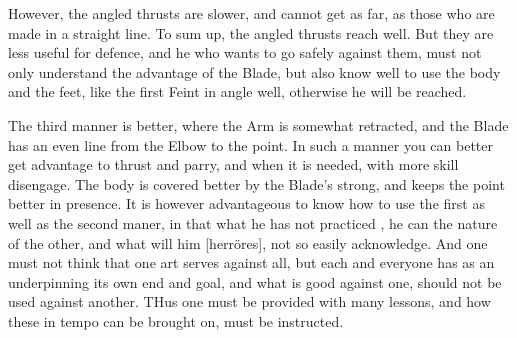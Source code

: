 \newpage


\newpage
{}
However, the angled thrusts are slower, and cannot get as far, as
those who are made in a straight line. To sum up, the angled thrusts
reach well. But they are less useful for defence, and he who wants to
go safely against them, must not only understand the advantage of the
Blade, but also know well to use the body and the feet, like the first
Feint in angle well, otherwise he will be reached.

The third manner is better, where the Arm is somewhat retracted, and
the Blade has an even line from the Elbow to the point. In such a
manner you can better get advantage to thrust and parry, and when it
is needed, with more skill disengage. The body is covered better by
the Blade's strong, and keeps the point better in presence. It is
however advantageous to know how to use the first as well as the
second maner, in that what he has not practiced , he can the nature of
the other, and what will him [herr\"{o}res], not so easily acknowledge. And one must not think
that one art serves against all, but each and everyone has as an
underpinning its own end and goal, and what is good against one,
should not be used against another. THus one must be provided with
many lessons, and how these in tempo can be brought on, must be
instructed.

